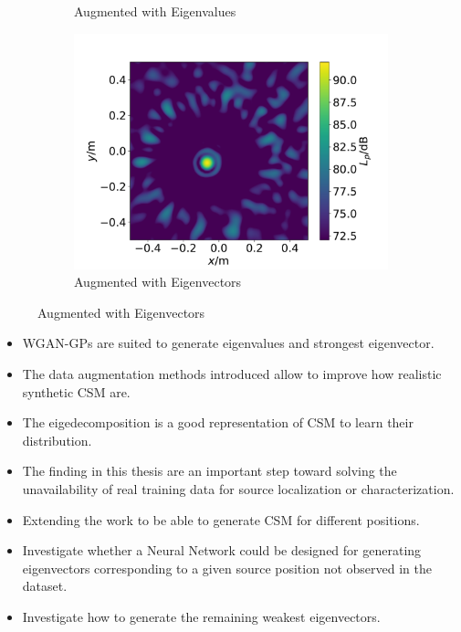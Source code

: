 \documentclass[12pt,pdftex,16x10]{elpres} %
\begin{document}
\begin{psli}
\begin{figure}
\begin{subfigure}[b]{0.45\linewidth}
      \caption{Augmented with Eigenvalues} 
    \end{subfigure}%
    \begin{subfigure}[b]{0.45\linewidth}
      \centering
      \includegraphics[width=0.5\linewidth]{figs/data_augmentation_evecs_augmented_csm.pdf} 
      \caption{Augmented with Eigenvectors}  
    \end{subfigure} 
  \end{figure}
\end{psli}

\begin{psli}[Conclusion]
  \begin{itemize}
    \item WGAN-GPs are suited to generate eigenvalues and strongest eigenvector. 
    \item The data augmentation methods introduced allow to improve how realistic synthetic CSM are.
    \item The eigedecomposition is a good representation of CSM to learn their distribution. 
    \item The finding in this thesis are an important step toward solving the unavailability of real training data for source localization or characterization. 
  \end{itemize}
\end{psli}

\begin{psli}
  \begin{itemize}
    \item Extending the work to be able to generate CSM for different positions. 
    \item Investigate whether a Neural Network could be designed for generating eigenvectors corresponding to a given source position not observed in the dataset.
    
    \item Investigate how to generate the remaining weakest eigenvectors. 
  \end{itemize}
\end{psli}
\end{document}
